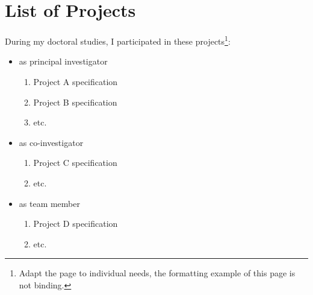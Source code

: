 \chapter*{List of Projects}
\label{sec:ListOfProjects}
During my doctoral studies, I participated in these projects\footnote{Adapt the page to individual needs, the formatting example of this page is not binding.}:
\begin{itemize}
	\item as principal investigator
		\begin{enumerate}
			\item Project A specification
			\item Project B specification
			\item etc.
		\end{enumerate}

	\item as co-investigator
		\begin{enumerate}[resume]
			\item Project C specification
			\item etc.
		\end{enumerate}

	\item as team member
		\begin{enumerate}[resume]
			\item Project D specification
			\item etc.
		\end{enumerate}
\end{itemize}

\endinput